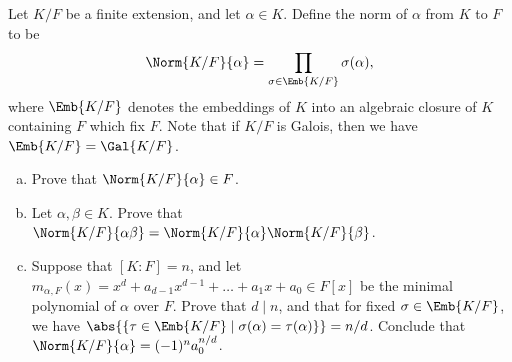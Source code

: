 \documentclass[10pt]{amsart}
\begin{document}
\begin{thm}
  Let $K/F$ be a finite extension, and let $\alpha \in K$.
  Define the norm of $\alpha$ from $K$ to $F$ to be 
  $$\Norm{K/F}{\alpha} = \prod_{\sigma \in \Emb{K/F}} \sigma(\alpha),$$
  where $\Emb{K/F}$ denotes the embeddings of $K$ into an algebraic closure of $K$ containing $F$ which fix $F$.
  Note that if $K/F$ is Galois, then we have $\Emb{K/F} = \Gal{K/F}$.
  \begin{enumerate}[(a)]
  \item
    Prove that $\Norm{K/F}{\alpha} \in F$.
  \item
    Let $\alpha, \beta \in K$.
    Prove that $\Norm{K/F}{\alpha\beta} = \Norm{K/F}{\alpha}\Norm{K/F}{\beta}$.
  \item
    Suppose that $[K : F] = n$, and let $m_{\alpha, F}(x) = x^d + a_{d - 1}x^{d-1} + \ldots + a_1x + a_0 \in F[x]$ be the minimal polynomial of $\alpha$ over $F$.
    Prove that $d \mid n$, and that for fixed $\sigma \in \Emb{K/F}$, we have $\abs{\left\{\tau \in \Emb{K/F} \;\middle\vert\; \sigma(\alpha) = \tau(\alpha)\right\}} = n/d$.
    Conclude that $\Norm{K/F}{\alpha} = (-1)^n a_0^{n/d}$.
  \end{enumerate}


\end{thm}
\end{document}
